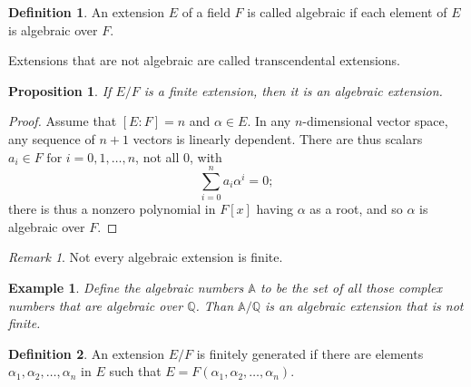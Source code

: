 \documentclass[draft]{article}
\newtheorem{prop}[thm]{Proposition}
\newtheorem{exmp}{Example}
\theoremstyle{definition}
\newtheorem{defn}{Definition}[section]
\theoremstyle{remark}
\newtheorem{rem}{Remark}[section]
\begin{document}
            \begin{defn}
                An extension $E$ of a field $F$ is called algebraic if each element of $E$ is algebraic over $F$.\par
                Extensions that are not algebraic are called transcendental extensions.
            \end{defn}
            
            \begin{prop}
                If $E/F$ is a finite extension, then it is an algebraic extension.
            \end{prop}
            
            \begin{proof}
                Assume that $[E:F] = n$ and $\alpha \in E$. In any $n$-dimensional vector space, any sequence of $n + 1$ vectors is linearly dependent. There are thus scalars $a_i \in F \text{ for } i = 0, 1, \dots, n$, not all 0, with
                \begin{equation*}
                    \displaystyle\sum_{i = 0}^{n}{a_i\alpha^i} = 0;
                \end{equation*}
                there is thus a nonzero polynomial in $F[x]$ having $\alpha$ as a root, and so $\alpha$ is algebraic over $F$.
            \end{proof}
            
            \begin{rem}
                Not every algebraic extension is finite.
            \end{rem}
            
            \begin{exmp}
            
                Define the algebraic numbers $\mathbb{A}$ to be the set of all those complex numbers that are algebraic over $\mathbb{Q}$. Than $\mathbb{A}/\mathbb{Q}$ is an algebraic extension that is not finite.
                
            \end{exmp}
            
            \begin{defn}
            
                An extension $E/F$ is finitely generated if there are elements $\alpha_1, \alpha_2, \dots, \alpha_n$ in $E$ such that $E = F(\alpha_1, \alpha_2, \dots, \alpha_n)$.
                
            \end{defn}
            
\end{document}
